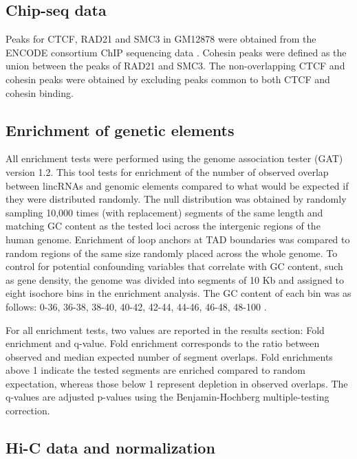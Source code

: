 \documentclass[11pt,a4paper]{report}
\begin{document}
\subsection*{Chip-seq data}

Peaks for CTCF, RAD21 and SMC3 in GM12878 were obtained from the ENCODE consortium ChIP sequencing data \cite{ENCODEProject2012}⁠. Cohesin peaks were defined as the union between the peaks of RAD21 and SMC3. The non-overlapping CTCF and cohesin peaks were obtained by excluding peaks common to both CTCF and cohesin binding.

\subsection*{Enrichment of genetic elements}

All enrichment tests were performed using the genome association tester (GAT) ⁠ version 1.2. This tool tests for enrichment of the number of observed overlap between lincRNAs and genomic elements compared to what would be expected if they were distributed randomly. The null distribution was obtained by randomly sampling 10,000 times (with replacement) segments of the same length and matching GC content as the tested loci across the intergenic regions of the human genome. Enrichment of loop anchors at TAD boundaries was compared to random regions of the same size randomly placed across the whole genome. To control for potential confounding variables that correlate with GC content, such as gene density, the genome was divided into segments of 10 Kb and assigned to eight isochore bins in the enrichment analysis. The GC content of each bin was as follows: 0-36, 36-38, 38-40, 40-42, 42-44, 44-46, 46-48, 48-100 \cite{Heger2013}. 

For all enrichment tests, two values are reported in the results section: Fold enrichment and q-value. Fold enrichment corresponds to the ratio between observed and median expected number of segment overlaps. Fold enrichments above 1 indicate the tested segments are enriched compared to random expectation, whereas those below 1 represent depletion in observed overlaps. The q-values are adjusted p-values using the Benjamin-Hochberg multiple-testing correction.

\subsection*{Hi-C data and normalization}
\end{document}
